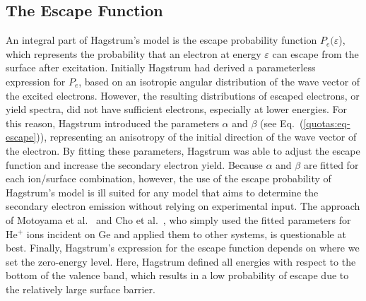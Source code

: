 \begin{refsection}
\subsection{The Escape Function} \label{quotas:sec-escape} 
 
An integral part of Hagstrum's model is the escape probability function 
$P_e(\varepsilon$), which represents the probability that an electron at 
energy $\varepsilon$ can escape from the surface after excitation. Initially 
Hagstrum had derived a parameterless expression for $P_e$, based on an 
isotropic angular distribution of the wave vector of the excited electrons. 
However, the resulting distributions of escaped electrons, or yield spectra, 
did not have sufficient electrons, especially at lower energies. For this 
reason, Hagstrum introduced the parameters $\alpha$ and $\beta$ (see 
Eq.~(\ref{quotas:eq-escape})), representing an anisotropy of the initial 
direction of the wave vector of the electron. By fitting these parameters, 
Hagstrum was able to adjust the escape function and increase the secondary 
electron yield. Because $\alpha$ and $\beta$ are fitted for each ion/surface 
combination, however, the use of the escape probability of Hagstrum's model is 
ill suited for any model that aims to determine the secondary electron 
emission without relying on experimental input. The approach of Motoyama et 
al.~\cite{Motoyama2006} and Cho et al.~\cite{Cho2007}, who simply used the 
fitted parameters for He$^+$ ions incident on Ge and applied them to other 
systems, is questionable at best. Finally, Hagstrum's expression for the 
escape function depends on where we set the zero-energy level. Here, Hagstrum 
defined all energies with respect to the bottom of the valence band, which 
results in a low probability of escape due to the relatively large surface 
barrier.\\ 
 

\end{refsection}
